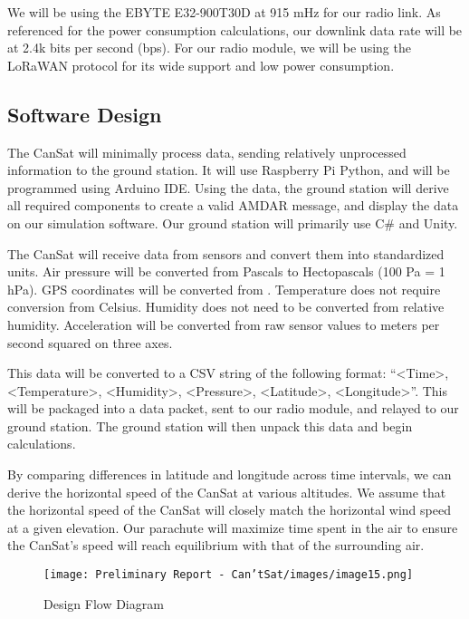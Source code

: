 \documentclass[10pt,twocolumn]{article}
\begin{document}
We will be using the EBYTE E32-900T30D at 915 mHz for our radio link. As referenced for the power consumption calculations, our downlink data rate will be at 2.4k bits per second (bps). For our radio module, we will be using the LoRaWAN protocol for its wide support and low power consumption.  


\subsection{\textbf{Software Design}}

The CanSat will minimally process data, sending relatively unprocessed information to the ground station. It will use Raspberry Pi Python, and will be programmed using Arduino IDE. Using the data, the ground station will derive all required components to create a valid AMDAR message, and display the data on our simulation software. Our ground station will primarily use C\# and Unity.

The CanSat will receive data from sensors and convert them into standardized units. Air pressure will be converted from Pascals to Hectopascals (100 Pa = 1 hPa). GPS coordinates will be converted from . Temperature does not require conversion from Celsius. Humidity does not need to be converted from relative humidity. Acceleration will be converted from raw sensor values to meters per second squared on three axes.

This data will be converted to a CSV string of the following format: 
``\textless Time\textgreater, \textless Temperature\textgreater, \textless Humidity\textgreater, \textless Pressure\textgreater, \textless Latitude\textgreater, \textless Longitude\textgreater''. 
This will be packaged into a data packet, sent to our radio module, and relayed to our ground station. The ground station will then unpack this data and begin calculations.


By comparing differences in latitude and longitude across time intervals, we can derive the horizontal speed of the CanSat at various altitudes. We assume that the horizontal speed of the CanSat will closely match the horizontal wind speed at a given elevation. Our parachute will maximize time spent in the air to ensure the CanSat’s speed will reach equilibrium with that of the surrounding air.

\begin{figure}[H]
\centering
\texttt{[image: Preliminary Report - Can'tSat/images/image15.png]}  
\caption{\label{fig:DesignFlow} Design Flow Diagram}
\end{figure}
\end{document}
